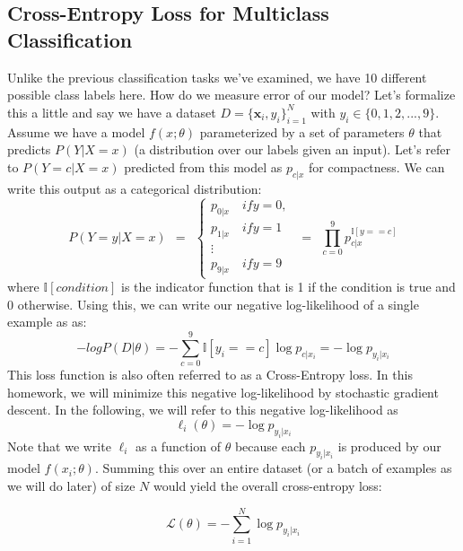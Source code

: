 \documentclass[a4paper,10pt]{article}
\newcommand{\xb}{\mathbf{x}}
\begin{document}
\subsection{Cross-Entropy Loss for Multiclass Classification}
Unlike the previous classification tasks we've examined, we have 10 different possible class labels here. How do we measure error of our model? Let's formalize this a little and say we have a dataset $D=\{\xb_i, y_i\}_{i=1}^N$ with $y_i \in \{0,1,2,...,9\}$. Assume we have a model $f(x;\theta)$ parameterized by a set of parameters $\theta$ that predicts $P(Y|X=x)$ (a distribution over our labels given an input). Let's refer to $P(Y=c|X=x)$ predicted from this model as $p_{c | x}$ for compactness. We can write this output as a categorical distribution:
%
\begin{equation}
    P(Y=y | X=x) ~~=~~ \begin{cases}
p_{0|x}\quad if y=0,\\
p_{1|x}\quad if y=1\\
\vdots\\
p_{9|x}\quad if y=9
\end{cases} ~~=~~ \prod_{c=0}^9 p_{c|x}^{\mathbb{I}[y==c]}
\end{equation}
%
where $\mathbb{I}[condition]$ is the indicator function that is 1 if the condition is true and 0 otherwise. Using this, we can write our negative log-likelihood of a single example as as:
%
\begin{equation}
    -log P(D|\theta) = -\sum_{c=0}^9 \mathbb{I}[y_i==c]\log p_{c|x_i} = -\log p_{y_i|x_i}
\end{equation}
%
This loss function is also often referred to as a Cross-Entropy loss. In this homework, we will minimize this negative log-likelihood by stochastic gradient descent. In the following, we will refer to this negative log-likelihood as 
\begin{equation}
\ell_i(\theta) = -\log p_{y_i|x_i}
\end{equation}
Note that we write $\ell_i$ as a function of $\theta$ because each $p_{y_i|x_i}$ is produced by our model $f(x_i; \theta)$. Summing this over an entire dataset (or a batch of examples as we will do later) of size $N$ would yield the overall cross-entropy loss:

\begin{equation}
\mathcal{L(\theta)} = -\sum_{i=1}^N\log p_{y_i|x_i}
\end{equation}

\newcommand{\bb}{\mathbf{b}}
\newcommand{\ab}{\mathbf{a}}
\newcommand{\zb}{\mathbf{z}}
\end{document}
